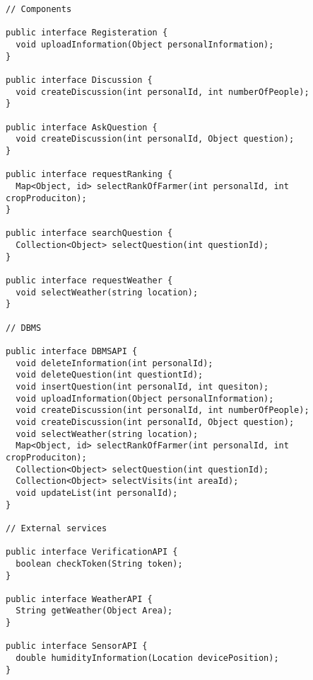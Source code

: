 \documentclass[../../main.tex]{subfiles}
\begin{document}
\begin{lstlisting}
// Components

public interface Registeration {
  void uploadInformation(Object personalInformation);
}

public interface Discussion {
  void createDiscussion(int personalId, int numberOfPeople);
}

public interface AskQuestion {
  void createDiscussion(int personalId, Object question);
}

public interface requestRanking {
  Map<Object, id> selectRankOfFarmer(int personalId, int cropProduciton);
}

public interface searchQuestion {
  Collection<Object> selectQuestion(int questionId);
}

public interface requestWeather {
  void selectWeather(string location);
}

// DBMS

public interface DBMSAPI {
  void deleteInformation(int personalId);
  void deleteQuestion(int questiontId);
  void insertQuestion(int personalId, int quesiton);
  void uploadInformation(Object personalInformation);
  void createDiscussion(int personalId, int numberOfPeople);
  void createDiscussion(int personalId, Object question);
  void selectWeather(string location);
  Map<Object, id> selectRankOfFarmer(int personalId, int cropProduciton);
  Collection<Object> selectQuestion(int questionId);
  Collection<Object> selectVisits(int areaId);
  void updateList(int personalId);
}

// External services

public interface VerificationAPI {
  boolean checkToken(String token);
}

public interface WeatherAPI {
  String getWeather(Object Area);
}

public interface SensorAPI {
  double humidityInformation(Location devicePosition);
}

\end{lstlisting}
\end{document}
